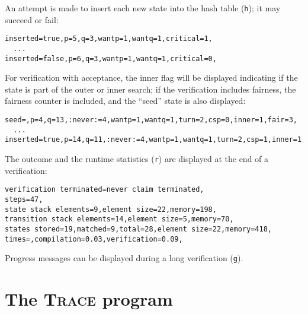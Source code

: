 \documentclass[11pt]{article}
\newcommand*{\trc}{\textsc{Trace}}
\newcommand*{\p}[1]{\texttt{#1}}
\begin{document}
An attempt is made to insert each new state into the hash table (\p{h});
it may succeed or fail:

\begin{footnotesize}
\begin{verbatim}
inserted=true,p=5,q=3,wantp=1,wantq=1,critical=1,
  ...
inserted=false,p=6,q=3,wantp=1,wantq=1,critical=0,
\end{verbatim}
\end{footnotesize}

For verification with acceptance, the inner flag will be displayed
indicating if the state is part of the outer or inner search; if the
verification includes fairness, the fairness counter is included,
and the ``seed'' state is also displayed:

\begin{footnotesize}
\begin{verbatim}
seed=,p=4,q=13,:never:=4,wantp=1,wantq=1,turn=2,csp=0,inner=1,fair=3,
  ...
inserted=true,p=14,q=11,:never:=4,wantp=1,wantq=1,turn=2,csp=1,inner=1,fair=1,
\end{verbatim}
\end{footnotesize}

The outcome and the runtime statistics (\p{r}) are
displayed at the end of a verification:

\begin{footnotesize}
\begin{verbatim}
verification terminated=never claim terminated,
steps=47,
state stack elements=9,element size=22,memory=198,
transition stack elements=14,element size=5,memory=70,
states stored=19,matched=9,total=28,element size=22,memory=418,
times=,compilation=0.03,verification=0.09,
\end{verbatim}
\end{footnotesize}

Progress messages can be displayed during a long verification (\p{g}).

\section{The \trc{} program}\label{s.trace}
\end{document}
